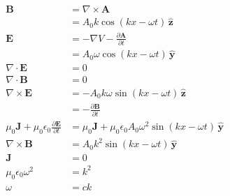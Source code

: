 \documentclass{article}
\renewcommand{\vec}[1]{\boldsymbol{\mathbf{#1}}}
\newcommand{\uvec}[1]{\hat{\vec{#1}}}
\begin{document}
\begin{align*}
  \vec{B}                                                              & = \nabla \times \vec{A}                                                          \\
                                                                       & = A_0 k \cos (k x - \omega t) \,\uvec{z}                                         \\
  \vec{E}                                                              & = -\nabla V - \frac{\partial \vec{A}}{\partial t}                                \\
                                                                       & = A_0 \omega \cos (k x - \omega t) \,\uvec{y}                                    \\
  \nabla \cdot \vec{E}                                                 & = 0                                                                              \\
  \nabla \cdot \vec{B}                                                 & = 0                                                                              \\
  \nabla \times \vec{E}                                                & = -A_0 k \omega \sin (k x - \omega t) \,\uvec{z}                                 \\
                                                                       & = -\frac{\partial \vec{B}}{\partial t}                                           \\
  \mu_0 \vec{J} + \mu_0 \epsilon_0 \frac{\partial \vec{E}}{\partial t} & = \mu_0 \vec{J} + \mu_0 \epsilon_0 A_0 \omega^2 \sin (k x - \omega t) \,\uvec{y} \\
  \nabla \times \vec{B}                                                & = A_0 k^2 \sin (k x - \omega t) \,\uvec{y}                                       \\
  \vec{J}                                                              & = 0                                                                              \\
  \mu_0 \epsilon_0 \omega^2                                            & = k^2                                                                            \\
  \omega                                                               & = c k
\end{align*}

\subsection{}
\end{document}

